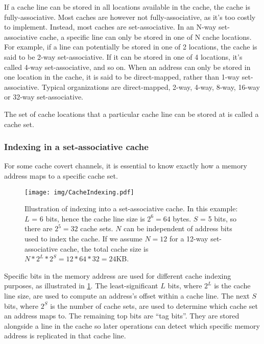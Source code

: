 \documentclass[a4paper,]{report}
\begin{document}
If a cache line can be stored in all locations available in the cache,
the cache is fully-associative. Most
caches are however not fully-associative, as it's too costly to
implement. Instead, most caches are
set-associative. In an N-way
set-associative cache, a specific line can only be stored in one of N
cache locations. For example, if a line can potentially be stored in one
of 2 locations, the cache is said to be 2-way set-associative. If it can
be stored in one of 4 locations, it's called 4-way set-associative, and
so on. When an address can only be stored in one location in the cache,
it is said to be direct-mapped, rather than 1-way set-associative. Typical organizations are
direct-mapped, 2-way, 4-way, 8-way, 16-way or 32-way set-associative.

The set of cache locations that a particular cache line can be stored at
is called a cache set.

\hypertarget{indexing-in-a-set-associative-cache}{%
\subsubsection{Indexing in a set-associative
cache}\label{indexing-in-a-set-associative-cache}}

For some cache covert channels, it is essential to know exactly how a
memory address maps to a specific cache set.

\begin{figure}
\hypertarget{fig:cache-indexing}{%
\centering
\texttt{[image: img/CacheIndexing.pdf]}
\caption{Illustration of indexing into a set-associative cache. In this
example: \(L\) = 6 bits, hence the cache line size is \(2^6=64\) bytes.
\(S\) = 5 bits, so there are \(2^5=32\) cache sets. \(N\) can be
independent of address bits used to index the cache. If we assume
\(N=12\) for a 12-way set-associative cache, the total cache size is
\(N*2^L*2^S=12*64*32=24\)KB.}\label{fig:cache-indexing}
}
\end{figure}

Specific bits in the memory address are used for different cache
indexing purposes, as illustrated in \cref{fig:cache-indexing}. The
least-significant \(L\) bits, where \(2^L\) is the cache line size, are
used to compute an address's offset within a cache line. The next \(S\)
bits, where \(2^S\) is the number of cache sets, are used to determine
which cache set an address maps to. The remaining top bits are ``tag
bits''. They are stored alongside a line in the cache so later
operations can detect which specific memory address is replicated in
that cache line.
\end{document}
